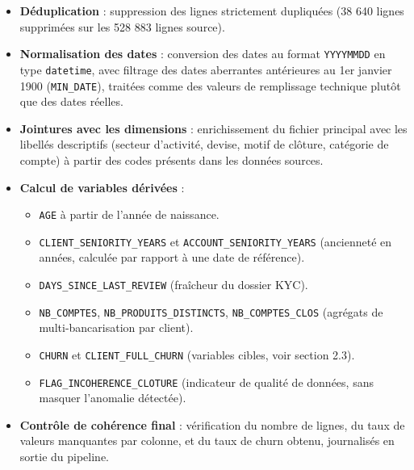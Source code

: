 \documentclass[11pt,a4paper]{article}
\providecommand{\tightlist}{\setlength{\itemsep}{0pt}\setlength{\parskip}{0pt}}
\begin{document}
\begin{itemize}
\tightlist
\item
  \textbf{Déduplication} : suppression des lignes strictement dupliquées
  (38 640 lignes supprimées sur les 528 883 lignes source).
\item
  \textbf{Normalisation des dates} : conversion des dates au format
  \texttt{YYYYMMDD} en type \texttt{datetime}, avec filtrage des dates
  aberrantes antérieures au 1er janvier 1900
  (\texttt{MIN\_\hspace{0pt}DATE}), traitées comme des valeurs de
  remplissage technique plutôt que des dates réelles.
\item
  \textbf{Jointures avec les dimensions} : enrichissement du fichier
  principal avec les libellés descriptifs (secteur d'activité, devise,
  motif de clôture, catégorie de compte) à partir des codes présents
  dans les données sources.
\item
  \textbf{Calcul de variables dérivées} :

  \begin{itemize}
  \tightlist
  \item
    \texttt{AGE} à partir de l'année de naissance.
  \item
    \texttt{CLIENT\_\hspace{0pt}SENIORITY\_\hspace{0pt}YEARS} et
    \texttt{ACCOUNT\_\hspace{0pt}SENIORITY\_\hspace{0pt}YEARS}
    (ancienneté en années, calculée par rapport à une date de
    référence).
  \item
    \texttt{DAYS\_\hspace{0pt}SINCE\_\hspace{0pt}LAST\_\hspace{0pt}REVIEW}
    (fraîcheur du dossier KYC).
  \item
    \texttt{NB\_\hspace{0pt}COMPTES},
    \texttt{NB\_\hspace{0pt}PRODUITS\_\hspace{0pt}DISTINCTS},
    \texttt{NB\_\hspace{0pt}COMPTES\_\hspace{0pt}CLOS} (agrégats de
    multi-bancarisation par client).
  \item
    \texttt{CHURN} et
    \texttt{CLIENT\_\hspace{0pt}FULL\_\hspace{0pt}CHURN} (variables
    cibles, voir section 2.3).
  \item
    \texttt{FLAG\_\hspace{0pt}INCOHERENCE\_\hspace{0pt}CLOTURE}
    (indicateur de qualité de données, sans masquer l'anomalie
    détectée).
  \end{itemize}
\item
  \textbf{Contrôle de cohérence final} : vérification du nombre de
  lignes, du taux de valeurs manquantes par colonne, et du taux de churn
  obtenu, journalisés en sortie du pipeline.
\end{itemize}
\end{document}
